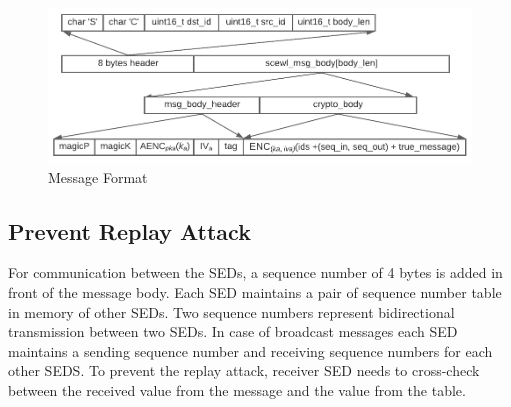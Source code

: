 \documentclass[11pt,oneside,onecolumn,letterpaper]{article}
\begin{document}
\begin{figure}[!htbp]
  \begin{centering}
  \includegraphics[width = .80\textwidth]{pic/msg-format.pdf}
  \caption{Message Format}
  \label{fig:msg}
  \end{centering}
\end{figure}

  \subsection{Prevent Replay Attack}
  For communication between the SEDs, a sequence number of 4 bytes is added in front of the message body. Each SED maintains a pair of sequence number table in memory of other SEDs. Two sequence numbers represent bidirectional transmission between two SEDs. In case of broadcast messages each SED maintains a sending sequence number and receiving sequence numbers for each other SEDS. To prevent the replay attack, receiver SED needs to cross-check between the received value from the message and the value from the table.
 
\end{document}
